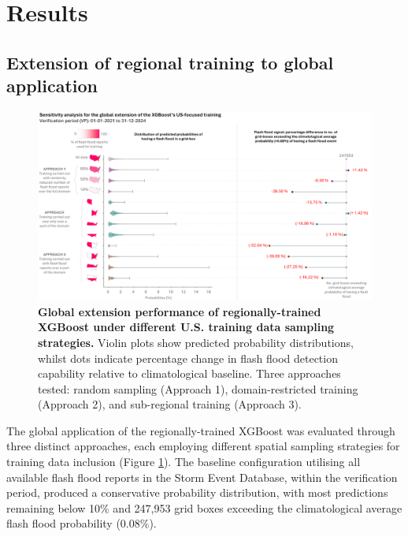 

\section{Results}

\subsection{Extension of regional training to global application}

\begin{figure}[htbp]
\centering
\includegraphics[width=\textwidth]{sensitivity_analysis_global_extension.png}
\caption{\textbf{Global extension performance of regionally-trained XGBoost under different U.S. training data sampling strategies.} Violin plots show predicted probability distributions, whilst dots indicate percentage change in flash flood detection capability relative to climatological baseline. Three approaches tested: random sampling (Approach 1), domain-restricted training (Approach 2), and sub-regional training (Approach 3).}
\label{fig:sensitivity_analysis_global_extension}
\end{figure}

The global application of the regionally-trained XGBoost was evaluated through three distinct approaches, each employing different spatial sampling strategies for training data inclusion (Figure \ref{fig:sensitivity_analysis_global_extension}). The baseline configuration utilising all available flash flood reports in the Storm Event Database, within the verification period, produced a conservative probability distribution, with most predictions remaining below 10\% and 247,953 grid boxes exceeding the climatological average flash flood probability (0.08\%).


